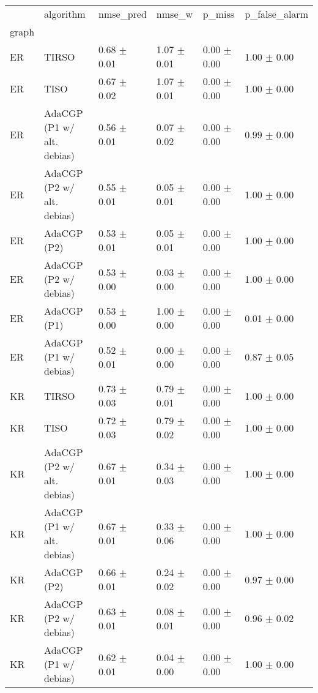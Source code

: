 \begin{tabular}{llllll}
\toprule
{} &                   algorithm &        nmse_pred &           nmse_w &           p_miss &    p_false_alarm \\
graph  &                             &                  &                  &                  &                  \\
\midrule
ER     &                       TIRSO &  0.68 $\pm$ 0.01 &  1.07 $\pm$ 0.01 &  0.00 $\pm$ 0.00 &  1.00 $\pm$ 0.00 \\
ER     &                        TISO &  0.67 $\pm$ 0.02 &  1.07 $\pm$ 0.01 &  0.00 $\pm$ 0.00 &  1.00 $\pm$ 0.00 \\
ER     &  AdaCGP (P1 w/ alt. debias) &  0.56 $\pm$ 0.01 &  0.07 $\pm$ 0.02 &  0.00 $\pm$ 0.00 &  0.99 $\pm$ 0.00 \\
ER     &  AdaCGP (P2 w/ alt. debias) &  0.55 $\pm$ 0.01 &  0.05 $\pm$ 0.01 &  0.00 $\pm$ 0.00 &  1.00 $\pm$ 0.00 \\
ER     &                 AdaCGP (P2) &  0.53 $\pm$ 0.01 &  0.05 $\pm$ 0.01 &  0.00 $\pm$ 0.00 &  1.00 $\pm$ 0.00 \\
ER     &       AdaCGP (P2 w/ debias) &  0.53 $\pm$ 0.00 &  0.03 $\pm$ 0.00 &  0.00 $\pm$ 0.00 &  1.00 $\pm$ 0.00 \\
ER     &                 AdaCGP (P1) &  0.53 $\pm$ 0.00 &  1.00 $\pm$ 0.00 &  0.00 $\pm$ 0.00 &  0.01 $\pm$ 0.00 \\
ER     &       AdaCGP (P1 w/ debias) &  0.52 $\pm$ 0.01 &  0.00 $\pm$ 0.00 &  0.00 $\pm$ 0.00 &  0.87 $\pm$ 0.05 \\
KR     &                       TIRSO &  0.73 $\pm$ 0.03 &  0.79 $\pm$ 0.01 &  0.00 $\pm$ 0.00 &  1.00 $\pm$ 0.00 \\
KR     &                        TISO &  0.72 $\pm$ 0.03 &  0.79 $\pm$ 0.02 &  0.00 $\pm$ 0.00 &  1.00 $\pm$ 0.00 \\
KR     &  AdaCGP (P2 w/ alt. debias) &  0.67 $\pm$ 0.01 &  0.34 $\pm$ 0.03 &  0.00 $\pm$ 0.00 &  1.00 $\pm$ 0.00 \\
KR     &  AdaCGP (P1 w/ alt. debias) &  0.67 $\pm$ 0.01 &  0.33 $\pm$ 0.06 &  0.00 $\pm$ 0.00 &  1.00 $\pm$ 0.00 \\
KR     &                 AdaCGP (P2) &  0.66 $\pm$ 0.01 &  0.24 $\pm$ 0.02 &  0.00 $\pm$ 0.00 &  0.97 $\pm$ 0.00 \\
KR     &       AdaCGP (P2 w/ debias) &  0.63 $\pm$ 0.01 &  0.08 $\pm$ 0.01 &  0.00 $\pm$ 0.00 &  0.96 $\pm$ 0.02 \\
KR     &       AdaCGP (P1 w/ debias) &  0.62 $\pm$ 0.01 &  0.04 $\pm$ 0.00 &  0.00 $\pm$ 0.00 &  1.00 $\pm$ 0.00 \\

\end{tabular}
